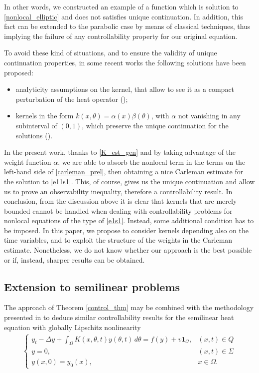 \documentclass[preprint,1p]{elsarticle}
\newcommand{\D}{\displaystyle}
\begin{document}
In other words, we constructed an example of a function which is solution to \eqref{nonlocal_elliptic} and does not satisfies unique continuation. In addition, this fact can be extended to the parabolic case by means of classical techniques, thus implying the failure of any controllability property for our original equation.

To avoid these kind of situations, and to ensure the validity of unique continuation properties, in some recent works the following solutions have been proposed:
\begin{itemize}
	\item analyticity assumptions on the kernel, that allow to see it as a compact perturbation of the heat operator (\cite{fernandez2016null});
	\item kernels in the form $k(x,\theta)=\alpha(x)\beta(\theta)$, with $\alpha$ not vanishing in any subinterval of $(0,1)$, which preserve the unique continuation for the solutions (\cite[Lemma 2.15]{micu2017local}).
\end{itemize}

In the present work, thanks to \eqref{K_est_gen} and by taking advantage of the weight function $\alpha$, we are able to absorb the nonlocal term in the terms on the left-hand side of \eqref{carleman_prel}, then obtaining a nice Carleman estimate for the solution to \eqref{e11s1}. This, of course, gives us the unique continuation and allow us to prove an observability inequality, therefore a controllability result.
In conclusion, from the discussion above it is clear that kernels that are merely bounded cannot be handled when dealing with controllability problems for nonlocal equations of the type of \eqref{e1s1}. Instead, some additional condition has to be imposed. In this paper, we propose to consider kernels depending also on the time variables, and to exploit the structure of the weights in the Carleman estimate. Nonetheless, we do not know whether our approach is the best possible or if, instead, sharper results can be obtained.

\subsection{Extension to semilinear problems}

The approach of Theorem \ref{control_thm} may be combined with the methodology presented in \cite{fabre1995approximate,fernandez1997null} to deduce similar controllability results for the semilinear heat equation with globally Lipschitz nonlinearity  
\begin{align}\label{heat_nl}
	\begin{cases}
		\D y_t - \Delta y + \int_\Omega K(x,\theta,t)y(\theta,t)\,d\theta = f(y) + v\mathbf{1}_{\mathcal O}, & (x,t)\in Q
		\\
		y = 0, & (x,t)\in\Sigma
		\\
		y(x,0) = y_0(x), & x\in\Omega.
	\end{cases}
\end{align}
\end{document}
